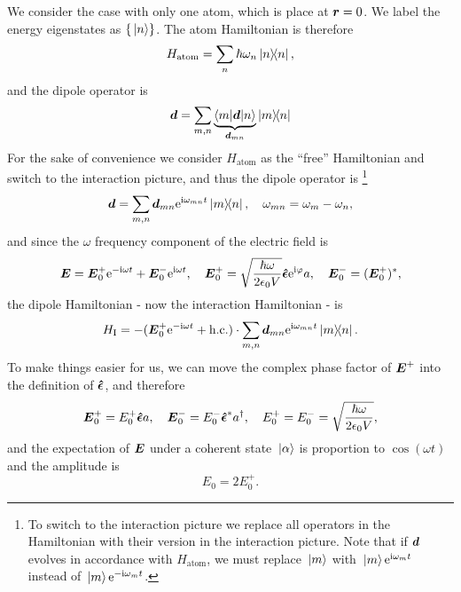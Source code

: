 \documentclass[hyperref, a4paper]{article}
\newcommand*{\ii}{\mathrm{i}}
\newcommand*{\ee}{\mathrm{e}}
\begin{document}
We consider the case with only one atom, which is place at $\vb*{r} = 0$.
We label the energy eigenstates as $\{\ket*{n}\}$. The atom Hamiltonian is therefore 
\begin{equation}
    H_\text{atom} = \sum_n \hbar \omega_n \dyad{n},
\end{equation}
and the dipole operator is 
\begin{equation}
    \vb*{d} = \sum_{m, n} \underbrace{\mel**{m}{\vb*{d}}{n}}_{\vb*{d}_{mn}} \dyad{m}{n}
\end{equation}
For the sake of convenience we consider $H_\text{atom}$ as the ``free'' Hamiltonian and switch to the interaction picture, and thus the dipole operator is%
\footnote{
    To switch to the interaction picture we replace all operators in the Hamiltonian with their version in the interaction picture.
    Note that if $\vb*{d}$ evolves in accordance with $H_\text{atom}$, we must replace $\ket*{m}$ with $\ket*{m} \ee^{\ii \omega_m t}$ instead of $\ket*{m} \ee^{-\ii \omega_m t}$.
}%
\begin{equation}
    \vb*{d} = \sum_{m, n} \vb*{d}_{mn} \ee^{\ii \omega_{mn} t} \dyad{m}{n}, \quad \omega_{mn} = \omega_m - \omega_n,
    \label{eq:dipole-interaction-picture}
\end{equation}
and since the $\omega$ frequency component of the electric field is 
\begin{equation}
    \vb*{E} = \vb*{E}_0^+ \ee^{- \ii \omega t} + \vb*{E}_0^- \ee^{\ii \omega t} , \quad \vb*{E}_0^+ = \sqrt{\frac{\hbar \omega}{2 \epsilon_0 V}} \vu*{\epsilon} \ee^{\ii \varphi} a, \quad \vb*{E}_0^- = (\vb*{E}_0^+)^*,
\end{equation}
the dipole Hamiltonian - now the interaction Hamiltonian - is 
\begin{equation}
    H_\text{I} = - (\vb*{E}_0^+ \ee^{- \ii \omega t} + \text{h.c.}) \cdot \sum_{m, n} \vb*{d}_{mn} \ee^{\ii \omega_{mn} t} \dyad{m}{n}.
\end{equation}
To make things easier for us, we can move the complex phase factor of $\vb*{E}^+$ into the definition of 
$\vu*{\epsilon}$, and therefore 
\begin{equation}
    \vb*{E}_0^+ = E_0^+ \vu*{\epsilon} a, \quad \vb*{E}_0^- = E_0^- \vu*{\epsilon}^* a^\dagger, \quad E_0^+ = E_0^- = \sqrt{\frac{\hbar \omega}{2 \epsilon_0 V}} ,
\end{equation}
and the expectation of $\vb*{E}$ under a coherent state $\ket*{\alpha}$ is proportion to $\cos (\omega t)$ and 
the amplitude is 
\begin{equation}
    E_0 = 2 E_0^+.
\end{equation}
\end{document}
